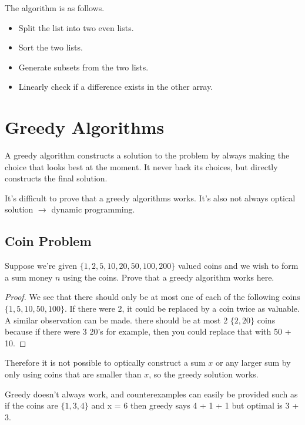 \documentclass[12pt]{scrartcl}
\begin{document}
The algorithm is as follows.
\begin{itemize}
  \item Split the list into two even lists.
  \item Sort the two lists.
  \item Generate subsets from the two lists.
  \item Linearly check if a difference exists in the other array.
\end{itemize}

\section{Greedy Algorithms}

A greedy algorithm constructs a solution to the problem by always making the 
choice that looks best at the moment. It never back its choices,
but directly constructs the final solution.

\begin{note}
  It's difficult to prove that a greedy algorithms works. It's also not always
  optical solution $\to$ dynamic programming.
\end{note}

\subsection{Coin Problem}

Suppose we’re given $\{1,2,5, 10, 20, 50, 100, 200\}$ valued coins and we 
wish to form a sum money $n$ using the coins. Prove that a greedy algorithm works here.

\begin{proof}
We see that there should only be at most one of each of the following coins $\{1,5, 10, 50, 100\}$. 
If there were 2, it could be replaced by a coin twice as valuable. A 
similar observation can be made. there should be at most 2 $\{2, 20\}$ coins 
because if there were 3 20’s for example, then you could replace that with 50 + 10.
\end{proof}

\begin{note}
  Therefore it is not possible to optically construct a sum $x$ or any larger 
  sum by only using coins that are smaller than $x$, so the greedy solution works.
\end{note}

\begin{note}
  Greedy doesn’t always work, and counterexamples 
  can easily be provided such as if the coins are $\{1, 3, 4\}$ and x = 6 then greedy says 4 + 1 + 1 but optimal is 3 + 3.
\end{note}
\end{document}

